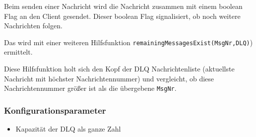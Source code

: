 \documentclass{article}
\begin{document}
Beim senden einer Nachricht wird die Nachricht zusammen mit einem boolean Flag an den Client gesendet. Dieser boolean Flag signalisiert, ob noch weitere Nachrichten folgen.

Das wird mit einer weiteren Hilfsfunktion \texttt{remainingMessagesExist(MsgNr,DLQ)}) ermittelt.

Diese Hilfsfunktion holt sich den Kopf der DLQ Nachrichtenliste (aktuellste Nachricht mit höchster Nachrichtennummer) und vergleicht, ob diese Nachrichtennummer größer ist als die übergebene \texttt{MsgNr}.

\subsubsection{Konfigurationsparameter}
\begin{itemize}
    \item Kapazität der DLQ als ganze Zahl
\end{itemize}
\end{document}

